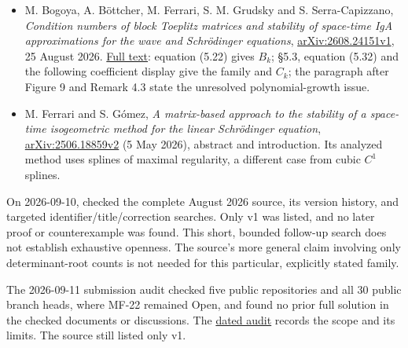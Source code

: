 \documentclass[11pt,a4paper]{article}
\providecommand{\tightlist}{\setlength{\itemsep}{0pt}\setlength{\parskip}{0pt}}
\begin{document}
\begin{itemize}
\tightlist
\item
  M. Bogoya, A. Böttcher, M. Ferrari, S. M. Grudsky and S.
  Serra-Capizzano, \emph{Condition numbers of block Toeplitz matrices
  and stability of space-time IgA approximations for the wave and
  Schrödinger equations},
  \href{https://arxiv.org/abs/2608.24151v1}{arXiv:2608.24151v1}, 25
  August 2026. \href{https://arxiv.org/html/2608.24151v1}{Full text}:
  equation (5.22) gives \(B_k\); §5.3, equation (5.32) and the following
  coefficient display give the family and \(C_k\); the paragraph after
  Figure 9 and Remark 4.3 state the unresolved polynomial-growth issue.
\item
  M. Ferrari and S. Gómez, \emph{A matrix-based approach to the
  stability of a space-time isogeometric method for the linear
  Schrödinger equation},
  \href{https://arxiv.org/abs/2506.18859v2}{arXiv:2506.18859v2} (5 May
  2026), abstract and introduction. Its analyzed method uses splines of
  maximal regularity, a different case from cubic \(C^1\) splines.
\end{itemize}

On 2026-09-10, checked the complete August 2026 source, its version
history, and targeted identifier/title/correction searches. Only v1 was
listed, and no later proof or counterexample was found. This short,
bounded follow-up search does not establish exhaustive openness. The
source's more general claim involving only determinant-root counts is
not needed for this particular, explicitly stated family.

The 2026-09-11 submission audit checked five public repositories and all
30 public branch heads, where MF-22 remained Open, and found no prior
full solution in the checked documents or discussions. The
\href{https://github.com/ajt60gaibb/OpenProblemsInNLA/blob/main/references/stepaniants-mf22-2026-09-11/verification/network-check.json}{dated
audit} records the scope and its limits. The source still listed only
v1.
\end{document}
